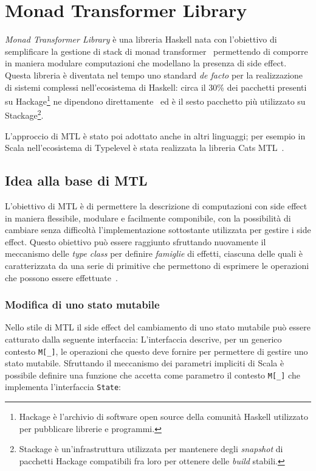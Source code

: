 \section{Monad Transformer Library}

\emph{Monad Transformer Library} è una libreria Haskell nata con l'obiettivo di semplificare la gestione di stack di monad transformer~\cite{cit:mtl} permettendo di comporre in maniera modulare computazioni che modellano la presenza di side effect.
Questa libreria è diventata nel tempo uno standard \emph{de facto} per la realizzazione di sistemi complessi nell'ecosistema di Haskell: circa il 30\% dei pacchetti presenti su Hackage\footnote{Hackage è l'archivio di software open source della comunità Haskell utilizzato per pubblicare librerie e programmi.} ne dipendono direttamente~\cite{cit:which-monads-haskell-developers-use-an-exploratory-study} ed è il sesto pacchetto più utilizzato su Stackage\footnote{Stackage è un'infrastruttura utilizzata per mantenere degli \emph{snapshot} di pacchetti Hackage compatibili fra loro per ottenere delle \emph{build} stabili.}.

L'approccio di MTL è stato poi adottato anche in altri linguaggi; per esempio in Scala nell'ecosistema di Typelevel è stata realizzata la libreria Cats MTL~\cite{cit:cats-mtl}.

\subsection{Idea alla base di MTL}
L'obiettivo di MTL è di permettere la descrizione di computazioni con side effect in maniera flessibile, modulare e facilmente componibile, con la possibilità di cambiare senza difficoltà l'implementazione sottostante utilizzata per gestire i side effect.
Questo obiettivo può essere raggiunto sfruttando nuovamente il meccanismo delle \emph{type class} per definire \emph{famiglie} di effetti, ciascuna delle quali è caratterizzata da una serie di primitive che permettono di esprimere le operazioni che possono essere effettuate~\cite{cit:functional-programming-with-overloading-and-higher-order-polymorphism}.

\subsubsection{Modifica di uno stato mutabile}
Nello stile di MTL il side effect del cambiamento di uno stato mutabile può essere catturato dalla seguente interfaccia:
L'interfaccia descrive, per un generico contesto \lstinline{M[_]}, le operazioni che questo deve fornire per permettere di gestire uno stato mutabile.
Sfruttando il meccanismo dei parametri impliciti di Scala è possibile definire una funzione che accetta come parametro il contesto \lstinline{M[_]} che implementa l'interfaccia \lstinline{State}:

